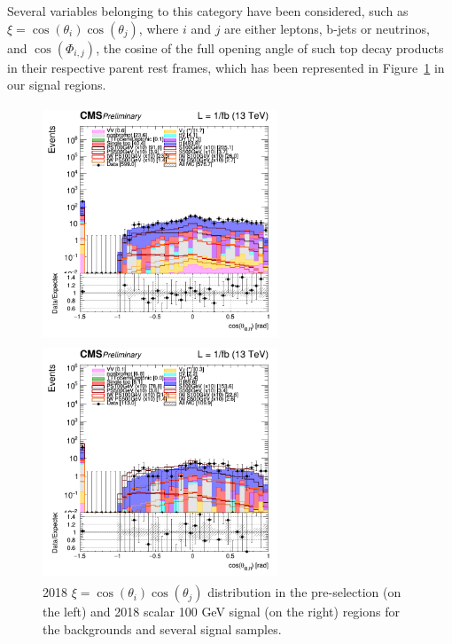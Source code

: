 \documentclass[a4paper, 10pt, openright]{report}
\begin{document}
Several variables belonging to this category have been considered, such as $\xi = \cos(\theta_i) \cos(\theta_j)$, where $i$ and $j$ are either leptons, b-jets or neutrinos, and $\cos(\Phi_{i,j})$, the cosine of the full opening angle of such top decay products in their respective parent rest frames, which has been represented in Figure~\ref{fig:SRdisc3} in our signal regions.

\begin{figure}[htbp]
\centering
\begin{minipage}[b]{.48\textwidth}
\includegraphics[width=7cm, height=7cm]{figs/2018/log_cratio_topCR_ll_costhetall.png}
\end{minipage}\hfill
\begin{minipage}[b]{.48\textwidth}
\includegraphics[width=7cm, height=7cm]{figs/2018/log_cratio_topCR_ll_DNN_signal0_scalar100_costhetall.png}
\end{minipage} \hfill
\caption{2018 $\xi = \cos(\theta_i) \cos(\theta_j)$ distribution in the pre-selection (on the left) and 2018 scalar 100 GeV signal (on the right) regions for the backgrounds and several signal samples.}
\label{fig:SRdisc3}
\end{figure}
\end{document}
